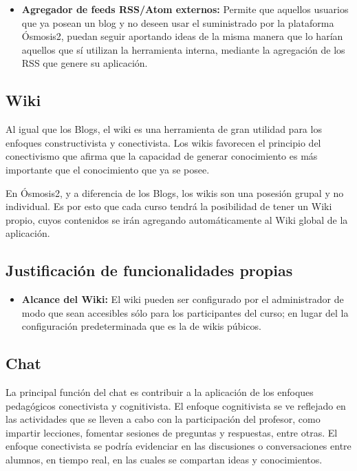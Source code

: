 \begin{itemize}


\item  \textbf{Agregador de feeds RSS/Atom externos:} Permite que aquellos usuarios que ya posean un blog y no deseen usar el suministrado por la plataforma Ósmosis2, puedan seguir aportando ideas de la misma manera que lo harían aquellos que sí utilizan la herramienta interna, mediante la agregación de los RSS que genere su aplicación.

\end{itemize}

\subsection{Wiki}

Al igual que los Blogs, el wiki es una herramienta de gran utilidad para los enfoques constructivista y conectivista. Los wikis favorecen el principio del conectivismo que afirma que la capacidad de generar conocimiento es más importante que el conocimiento que ya se posee.

En Ósmosis2, y a diferencia de los Blogs, los wikis son una posesión grupal y no individual. Es por esto que cada curso tendrá la posibilidad de tener un Wiki propio, cuyos contenidos se irán agregando automáticamente al Wiki global de la aplicación.


\subsection*{Justificación de funcionalidades propias}

\begin{itemize}

\item \textbf{Alcance del Wiki:} El wiki pueden ser configurado por el administrador de modo que sean accesibles sólo para los participantes del curso; en lugar del la configuración predeterminada que es la de wikis púbicos.

\end{itemize}

\subsection{Chat}
La principal función del chat es contribuir a la aplicación de los enfoques pedagógicos conectivista y cognitivista. El enfoque cognitivista se ve reflejado en las actividades que se lleven a cabo con la participación del profesor, como impartir lecciones, fomentar sesiones de preguntas y respuestas, entre otras. El enfoque conectivista se podría evidenciar en las discusiones o conversaciones entre alumnos, en tiempo real, en las cuales se compartan ideas y conocimientos.

